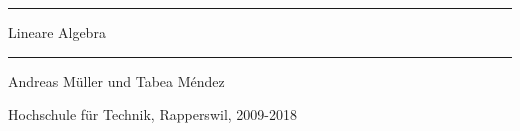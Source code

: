 \documentclass[a4paper,12pt]{book}
\begin{document}
\pagestyle{fancy}
\frontmatter
\newcommand\HRule{\noindent\rule{\linewidth}{1.5pt}}
\begin{titlepage}
\HRule
\vspace*{10pt}
\begin{flushright}
{\Huge
Lineare Algebra}
\end{flushright}
\HRule
\begin{flushright}
\vspace{30pt}
\LARGE
Andreas Müller
und
Tabea Méndez
\end{flushright}
\begin{center}
Hochschule für Technik, Rapperswil, 2009-2018
\end{center}
\end{titlepage}
\hypersetup{
    linktoc=all,
    linkcolor=blue
}
\tableofcontents
\newtheorem{satz}{Satz}[chapter]
\newtheorem{hilfssatz}[satz]{Hilfssatz}
\newtheorem{definition}[satz]{Definition}
\newtheorem{konvention}[satz]{Konvention}
\newtheorem{annahme}[satz]{Annahme}
\newtheorem{aufgabe}[satz]{Aufgabe}
\newenvironment{beispiel}[1][Beispiel]{%
\begin{proof}[\bf #1]%
\renewcommand{\qedsymbol}{$\bigcirc$}%
}{\end{proof}}
\mainmatter









%
%
%
%
%
%
%
%
%
%
%
%
%



\vfill
\pagebreak
\ifodd\value{page}\else\null\clearpage\fi

\appendix
\end{document}

